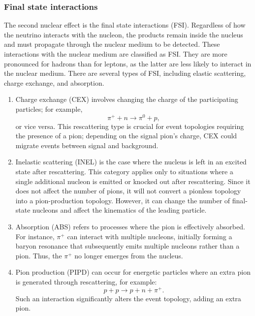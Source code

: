 \subsubsection{Final state interactions}
\label{sec:nuint-fsi}
The second nuclear effect is the final state interactions (FSI).
Regardless of how the neutrino interacts with the nucleon, the products remain inside the nucleus and must propagate through the nuclear medium to be detected.
These interactions with the nuclear medium are classified as FSI.
They are more pronounced for hadrons than for leptons, as the latter are less likely to interact in the nuclear medium.
There are several types of FSI, including elastic scattering, charge exchange, and absorption.
\begin{enumerate}
  \item 
  Charge exchange (CEX) involves changing the charge of the participating particles; for example,
  \begin{equation}
      \pi^+ + n \rightarrow \pi^0 + p,
  \end{equation}
  or vice versa. This rescattering type is crucial for event topologies requiring the presence of a pion; depending on the signal pion’s charge, CEX could migrate events between signal and background. 

  \item 
  Inelastic scattering (INEL) is the case where the nucleus is left in an excited state after rescattering. This category applies only to situations where a single additional nucleon is emitted or knocked out after rescattering. Since it does not affect the number of pions, it will not convert a pionless topology into a pion-production topology. However, it can change the number of final-state nucleons and affect the kinematics of the leading particle.

  \item 
  Absorption (ABS) refers to processes where the pion is effectively absorbed. For instance, $\pi^+$ can interact with multiple nucleons, initially forming a baryon resonance that subsequently emits multiple nucleons rather than a pion. Thus, the $\pi^+$ no longer emerges from the nucleus.

  \item 
  Pion production (PIPD) can occur for energetic particles where an extra pion is generated through rescattering, for example:
  \begin{equation}
      p + p \rightarrow p + n + \pi^+.
  \end{equation}
  Such an interaction significantly alters the event topology, adding an extra pion.
\end{enumerate}

